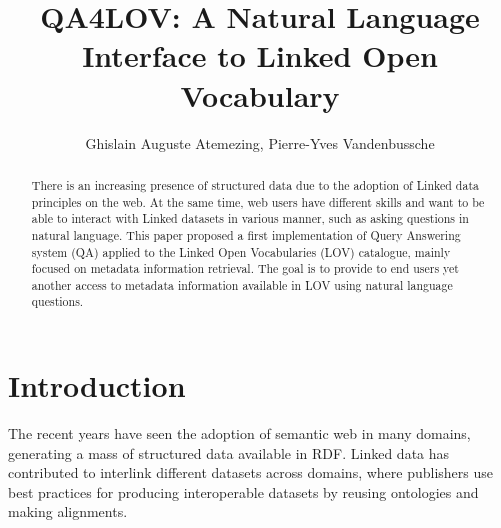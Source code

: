 \documentclass[runningheads,a4paper]{llncs}
\begin{document}
\title{QA4LOV: A Natural Language Interface to Linked Open Vocabulary}

\author{ Ghislain Auguste Atemezing, Pierre-Yves Vandenbussche }


\maketitle



\begin{abstract}

There is an increasing presence of structured data due to the adoption of Linked data principles on the web. At the same time, web users have different skills and want to be able to interact with Linked datasets in various manner, such as asking questions in natural language. 
This paper proposed a first implementation of Query Answering system (QA) applied to the Linked Open Vocabularies (LOV) catalogue, mainly focused on metadata information retrieval. The goal is to provide to end users yet another access to metadata information available in LOV  using natural language questions.


\end{abstract}




\section{Introduction}\label{sec:introduction}
The recent years have seen the adoption of semantic web in many domains, generating a mass of structured data available in RDF. Linked data has contributed to interlink different datasets across domains, where publishers use best practices for producing interoperable datasets by reusing ontologies and making alignments. 
\end{document}
